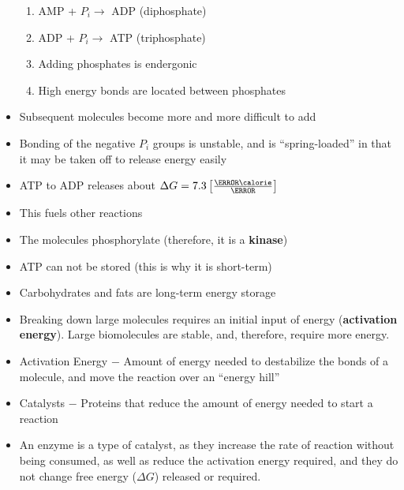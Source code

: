 \documentclass[12pt]{article}
\begin{document}
\begin{itemize}
\begin{enumerate}
      \item AMP + $P_i \to$ ADP (diphosphate)

      \item ADP + $P_i \to$ ATP (triphosphate)

      \item Adding phosphates is endergonic 

      \item High energy bonds are located between phosphates

    \end{enumerate}

  \item Subsequent  molecules become more and more difficult to add

  \item Bonding of the negative $P_i$ groups is unstable, and is ``spring-loaded'' in that it may be taken off to release energy easily

  \item ATP to ADP releases about $\Delta G=7.3 \left[ \frac{\kilo\calorie}{\mole}  \right]$

  \item This fuels other reactions

  \item The molecules phosphorylate (therefore, it is a \textbf{kinase})

  \item ATP can not be stored (this is why it is short-term)

  \item Carbohydrates and fats are long-term energy storage

  \item Breaking down large molecules requires an initial input of energy (\textbf{activation energy}). Large biomolecules are stable, and, therefore, require more energy.

  \item Activation Energy $-$ Amount of energy needed to destabilize the bonds of a molecule, and move the reaction over an ``energy hill''

  \item Catalysts $-$ Proteins that reduce the amount of energy needed to start a reaction

  \item An enzyme is a type of catalyst, as they increase the rate of reaction without being consumed, as well as reduce the activation energy required, and they do not change free energy ($\Delta G$) released or required.


\end{itemize}
\end{document}
